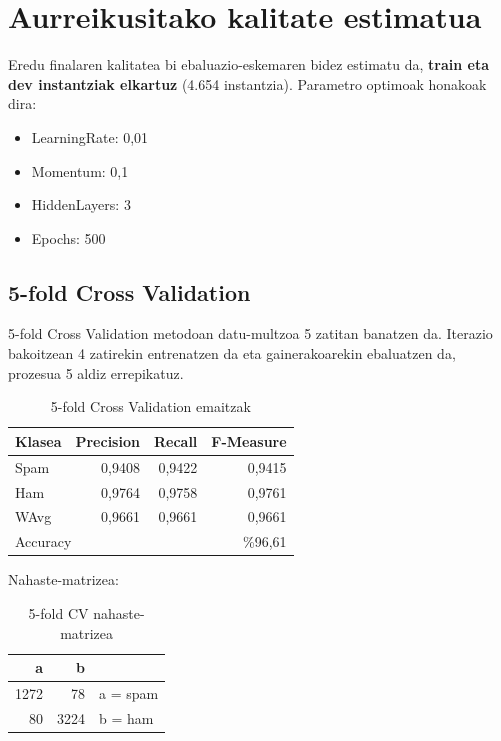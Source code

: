 \documentclass[12pt, a4paper]{article}
\begin{document}
\newpage
\section{Aurreikusitako kalitate estimatua}

Eredu finalaren kalitatea bi ebaluazio-eskemaren bidez estimatu da,
\textbf{train eta dev instantziak elkartuz} (4.654 instantzia).
Parametro optimoak honakoak dira:

\begin{itemize}
    \item LearningRate: 0,01
    \item Momentum: 0,1
    \item HiddenLayers: 3
    \item Epochs: 500
\end{itemize}

\subsection{5-fold Cross Validation}

5-fold Cross Validation metodoan datu-multzoa 5 zatitan banatzen da.
Iterazio bakoitzean 4 zatirekin entrenatzen da eta gainerakoarekin ebaluatzen da,
prozesua 5 aldiz errepikatuz.

\begin{table}[H]
    \centering
    \caption{5-fold Cross Validation emaitzak}
    \begin{tabular}{lrrr}
        \toprule
        \textbf{Klasea} & \textbf{Precision} & \textbf{Recall} & \textbf{F-Measure} \\
        \midrule
        Spam  & 0,9408 & 0,9422 & 0,9415 \\
        Ham   & 0,9764 & 0,9758 & 0,9761 \\
        WAvg  & 0,9661 & 0,9661 & 0,9661 \\
        \midrule
        \multicolumn{2}{l}{Accuracy} & \multicolumn{2}{r}{\%96,61} \\
        \bottomrule
    \end{tabular}
\end{table}

Nahaste-matrizea:

\begin{table}[H]
    \centering
    \caption{5-fold CV nahaste-matrizea}
    \begin{tabular}{rr|l}
        \toprule
        \textbf{a} & \textbf{b} & \\
        \midrule
        1272 & 78  & a = spam \\
        80   & 3224 & b = ham  \\
        \bottomrule
    \end{tabular}
\end{table}
\end{document}
